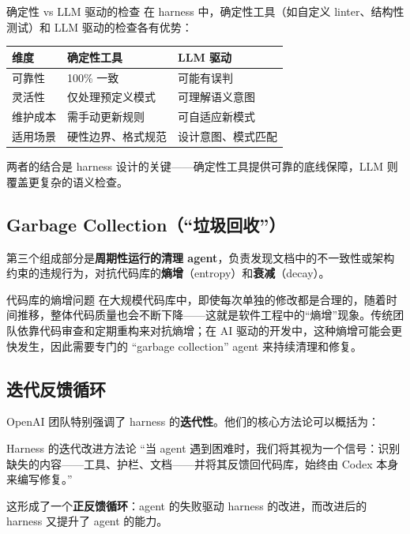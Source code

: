 \begin{knowledgebox}{确定性 vs LLM 驱动的检查}
在 harness 中，确定性工具（如自定义 linter、结构性测试）和 LLM 驱动的检查各有优势：

\begin{table}[H]
\centering
\begin{tabular}{lll}
\toprule
\textbf{维度} & \textbf{确定性工具} & \textbf{LLM 驱动} \\
\midrule
可靠性 & 100\% 一致 & 可能有误判 \\
灵活性 & 仅处理预定义模式 & 可理解语义意图 \\
维护成本 & 需手动更新规则 & 可自适应新模式 \\
适用场景 & 硬性边界、格式规范 & 设计意图、模式匹配 \\
\bottomrule
\end{tabular}
\end{table}

两者的结合是 harness 设计的关键------确定性工具提供可靠的底线保障，LLM 则覆盖更复杂的语义检查。
\end{knowledgebox}

\subsection{Garbage Collection（``垃圾回收''）}

第三个组成部分是\textbf{周期性运行的清理 agent}，负责发现文档中的不一致性或架构约束的违规行为，对抗代码库的\textbf{熵增}（entropy）和\textbf{衰减}（decay）。

\begin{warningbox}{代码库的熵增问题}
在大规模代码库中，即使每次单独的修改都是合理的，随着时间推移，整体代码质量也会不断下降------这就是软件工程中的``熵增''现象。传统团队依靠代码审查和定期重构来对抗熵增；在 AI 驱动的开发中，这种熵增可能会更快发生，因此需要专门的 ``garbage collection'' agent 来持续清理和修复。
\end{warningbox}

\subsection{迭代反馈循环}

OpenAI 团队特别强调了 harness 的\textbf{迭代性}。他们的核心方法论可以概括为：

\begin{importantbox}{Harness 的迭代改进方法论}
``当 agent 遇到困难时，我们将其视为一个信号：识别缺失的内容------工具、护栏、文档------并将其反馈回代码库，始终由 Codex 本身来编写修复。''

这形成了一个\textbf{正反馈循环}：agent 的失败驱动 harness 的改进，而改进后的 harness 又提升了 agent 的能力。
\end{importantbox}


